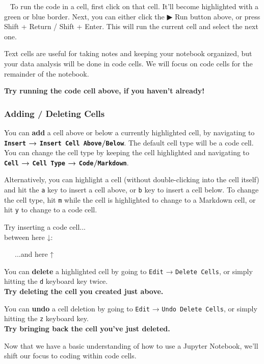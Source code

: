 \documentclass[11pt]{article}
\begin{document}
 ~ To run the code in a cell, first click on that cell. It'll become
highlighted with a green or blue border. Next, you can either click the
▶ Run button above, or press Shift + Return / Shift + Enter. This will
run the current cell and select the next one.

Text cells are useful for taking notes and keeping your notebook
organized, but your data analysis will be done in code cells. We will
focus on code cells for the remainder of the notebook.

{\textbf{Try running the code cell above, if you haven't already!}}

    \subsubsection{Adding / Deleting Cells}\label{adding-deleting-cells}

You can \textbf{add} a cell above or below a currently highlighted cell,
by navigating to \textbf{\texttt{Insert} →
\texttt{Insert\ Cell\ Above}/\texttt{Below}}. The default cell type will
be a code cell. You can change the cell type by keeping the cell
highlighted and navigating to \textbf{\texttt{Cell} →
\texttt{Cell\ Type} → \texttt{Code}/\texttt{Markdown}}.

Alternatively, you can highlight a cell (without double-clicking into
the cell itself) and hit the \texttt{a} key to insert a cell above, or
\texttt{b} key to insert a cell below. To change the cell type, hit
\texttt{m} while the cell is highlighted to change to a Markdown cell,
or hit \texttt{y} to change to a code cell.

{Try inserting a code cell...\\
between here ↓:}

    {  ~...and here ↑}

You can \textbf{delete} a highlighted cell by going to \texttt{Edit} →
\texttt{Delete\ Cells}, or simply hitting the \texttt{d} keyboard key
twice.\\
{\textbf{Try deleting the cell you created just above.}}

You can \textbf{undo} a cell deletion by going to \texttt{Edit} →
\texttt{Undo\ Delete\ Cells}, or simply hitting the \texttt{z} keyboard
key.\\
{\textbf{Try bringing back the cell you've just deleted.}}

Now that we have a basic understanding of how to use a Jupyter Notebook,
we'll shift our focus to coding within code cells.
\end{document}
